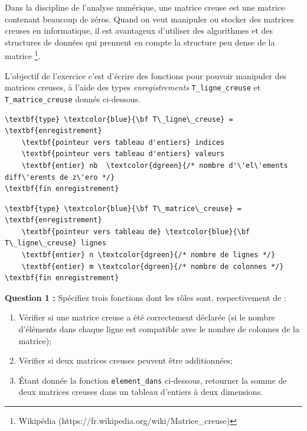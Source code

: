 \documentclass[11pt]{exam}
\begin{document}
\begin{questions}

\question Dans la discipline de l'analyse num\'erique, une matrice creuse est une matrice contenant beaucoup de z\'eros. Quand on veut manipuler ou stocker des matrices creuses en informatique, il est avantageux d'utiliser des algorithmes et des structures de donn\'ees qui prennent en compte la structure peu dense de la matrice \footnote{Wikip\'edia (https://fr.wikipedia.org/wiki/Matrice\_creuse)}. 

L'objectif de l'exercice c'est d'\'ecrire des fonctions pour pouvoir manipuler des matrices creuses, \`a l'aide des types \textit{enregistrements} \texttt{T\_ligne\_creuse} et \texttt{T\_matrice\_creuse} donn\'es ci-dessous. 
 

\begin{Verbatim}
\textbf{type} \textcolor{blue}{\bf T\_ligne\_creuse} = \textbf{enregistrement}
	\textbf{pointeur vers tableau d'entiers} indices
	\textbf{pointeur vers tableau d'entiers} valeurs
	\textbf{entier} nb  \textcolor{dgreen}{/* nombre d'\'el\'ements diff\'erents de z\'ero */}
\textbf{fin enregistrement} 
\end{Verbatim}

\begin{Verbatim}
\textbf{type} \textcolor{blue}{\bf T\_matrice\_creuse} = \textbf{enregistrement}
	\textbf{pointeur vers tableau de} \textcolor{blue}{\bf T\_ligne\_creuse} lignes
	\textbf{entier} n \textcolor{dgreen}{/* nombre de lignes */}
	\textbf{entier} m \textcolor{dgreen}{/* nombre de colonnes */}
\textbf{fin enregistrement} 
\end{Verbatim}

\textbf{Question 1 :} Sp\'ecifiez trois fonctions dont les r\^oles sont, respectivement de :
\begin{enumerate}[label=\alph*)]
\item V\'erifier si une matrice creuse a \'et\'e correctement d\'eclar\'ee (si le nombre d'\'el\'ements dans chaque ligne est compatible avec le nombre de colonnes de la matrice);
\item V\'erifier si deux matrices creuses peuvent \^etre additionn\'ees;
\item \'Etant donnée la fonction \texttt{element\_dans} ci-dessous, retourner la somme de deux matrices creuses dans un tableau d'entiers \`a deux dimensions.
\end{enumerate}

\newpage


\end{questions}
\end{document}
